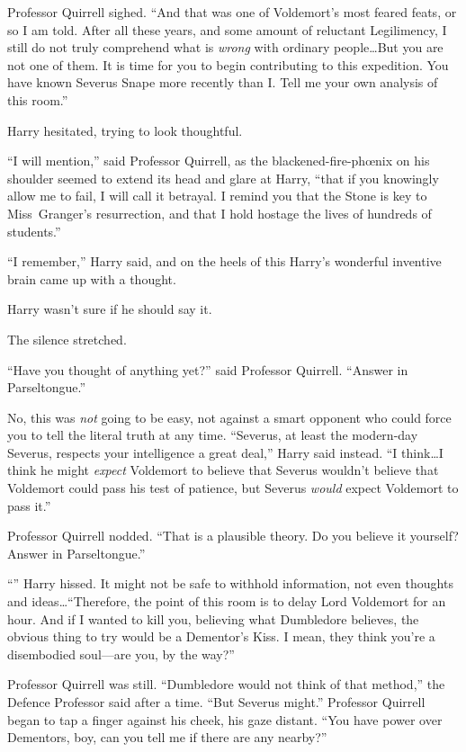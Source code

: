 Professor Quirrell sighed. “And that was one of Voldemort’s most feared feats, or so I am told. After all these years, and some amount of reluctant Legilimency, I still do not truly comprehend what is \emph{wrong} with ordinary people…But you are not one of them. It is time for you to begin contributing to this expedition. You have known Severus Snape more recently than I\@. Tell me your own analysis of this room.”

Harry hesitated, trying to look thoughtful.

“I will mention,” said Professor Quirrell, as the blackened-fire-phœnix on his shoulder seemed to extend its head and glare at Harry, “that if you knowingly allow me to fail, I will call it betrayal. I remind you that the Stone is key to Miss~Granger’s resurrection, and that I hold hostage the lives of hundreds of students.”

“I remember,” Harry said, and on the heels of this Harry’s wonderful inventive brain came up with a thought.

Harry wasn’t sure if he should say it.

The silence stretched.

“Have you thought of anything yet?” said Professor Quirrell. “Answer in Parseltongue.”

No, this was \emph{not} going to be easy, not against a smart opponent who could force you to tell the literal truth at any time. “Severus, at least the modern-day Severus, respects your intelligence a great deal,” Harry said instead. “I think…I think he might \emph{expect} Voldemort to believe that Severus wouldn’t believe that Voldemort could pass his test of patience, but Severus \emph{would} expect Voldemort to pass it.”

Professor Quirrell nodded. “That is a plausible theory. Do you believe it yourself? Answer in Parseltongue.”

“” Harry hissed. It might not be safe to withhold information, not even thoughts and ideas…“Therefore, the point of this room is to delay Lord Voldemort for an hour. And if I wanted to kill you, believing what Dumbledore believes, the obvious thing to try would be a Dementor’s Kiss. I mean, they think you’re a disembodied soul—are you, by the way?”

Professor Quirrell was still. “Dumbledore would not think of that method,” the Defence Professor said after a time. “But Severus might.” Professor Quirrell began to tap a finger against his cheek, his gaze distant. “You have power over Dementors, boy, can you tell me if there are any nearby?”


